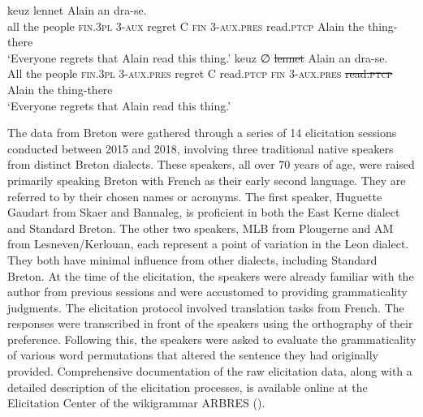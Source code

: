 \documentclass[output=paper,colorlinks,citecolor=brown]{langscibook}
\begin{document}
\ea\label{ex:jouitteau:1}
\ea \label{ex:jouitteau:1a}
\gll {}   {} {} keuz \FirstPosition{\BoldNull} {} {} lennet Alain an dra-se. \\ 
     all the people \textsc{fin}.\textsc{3pl} \textsc{3}-\textsc{aux} regret C \textsc{fin} \textsc{\textbf{}3}-\textsc{aux}.\textsc{pres} read.\textsc{ptcp} Alain the thing-there \\
\glt ‘Everyone regrets that Alain read this thing.’
\ex \label{ex:jouitteau:1b}
\gll {}   {} {} keuz {∅}   {}     {}    {}   \sout{lennet}  Alain an dra-se. \\ 
All the people \textsc{fin.3pl} 3\textsc{-aux.pres} regret C read\textsc{.ptcp} \textsc{fin} \textsc{{3}-aux.pres} \sout{read\textsc{.ptcp}} Alain the thing-there\\
\glt `Everyone regrets that Alain read this thing.'
\z
\z

\noindent The data from Breton were gathered through a series of 14 elicitation sessions conducted between 2015 and 2018, involving three traditional native speakers from distinct Breton dialects. These speakers, all over 70 years of age, were raised primarily speaking Breton with French as their early second language. They are referred to by their chosen names or acronyms. The first speaker, Huguette Gaudart from Skaer and Bannaleg, is proficient in both the East Kerne dialect and Standard Breton. The other two speakers, MLB from Plougerne and AM from Lesneven/Kerlouan, each represent a point of variation in the Leon dialect. They both have minimal influence from other dialects, including Standard Breton. At the time of the elicitation, the speakers were already familiar with the author from previous sessions and were accustomed to providing grammaticality judgments. The elicitation protocol involved translation tasks from French. The responses were transcribed in front of the speakers using the orthography of their preference. Following this, the speakers were asked to evaluate the grammaticality of various word permutations that altered the sentence they had originally provided. Comprehensive documentation of the raw elicitation data, along with a detailed description of the elicitation processes, is available online at the Elicitation Center of the wikigrammar ARBRES (\citealt{mj:Jouitteau2009}).
\end{document}
